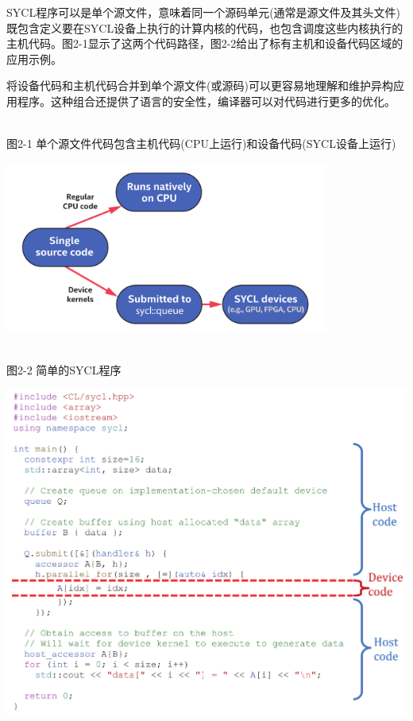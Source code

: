 
SYCL程序可以是单个源文件，意味着同一个源码单元(通常是源文件及其头文件)既包含定义要在SYCL设备上执行的计算内核的代码，也包含调度这些内核执行的主机代码。图2-1显示了这两个代码路径，图2-2给出了标有主机和设备代码区域的应用示例。\par

将设备代码和主机代码合并到单个源文件(或源码)可以更容易地理解和维护异构应用程序。这种组合还提供了语言的安全性，编译器可以对代码进行更多的优化。\par

\hspace*{\fill} \\ %
图2-1 单个源文件代码包含主机代码(CPU上运行)和设备代码(SYCL设备上运行)
\begin{center}
	\includegraphics[width=0.8\textwidth]{content/chapter-2/images/2}
\end{center}

\hspace*{\fill} \\ %
图2-2 简单的SYCL程序
\begin{center}
	\includegraphics[width=1.\textwidth]{content/chapter-2/images/3}
\end{center}

